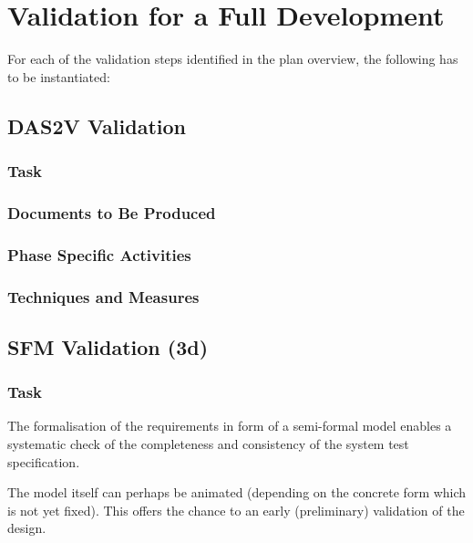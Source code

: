 \documentclass{template/openetcs_report}
\begin{document}
\section{Validation for a Full Development}
\label{sec:valid-full-devel}

For each of the validation steps identified in the plan
  overview, the following has to be instantiated:
\subsection{DAS2V Validation}
\label{sec:dasv-validation}

\subsubsection{Task}
\label{sec:dasv-valid-task}


\subsubsection{Documents to Be Produced}
\label{sec:dasv-valid-docum-be-prod}


\subsubsection{Phase Specific Activities}
\label{sec:dasv-valid-phase-spec-activ}

\subsubsection{Techniques and Measures}
\label{sec:dasv-valid-techniques-measures}



\subsection{SFM Validation (3d)}
\label{sec:sfm-validation}

\subsubsection{Task}
\label{sec:sfm-valid-task}

The formalisation of the requirements in form of a semi-formal model
enables a systematic check of the completeness and consistency of the
system test specification.

The model itself can perhaps be animated (depending on the concrete
form which is not yet fixed). This offers the chance to an early
(preliminary) validation of the design.
\end{document}
